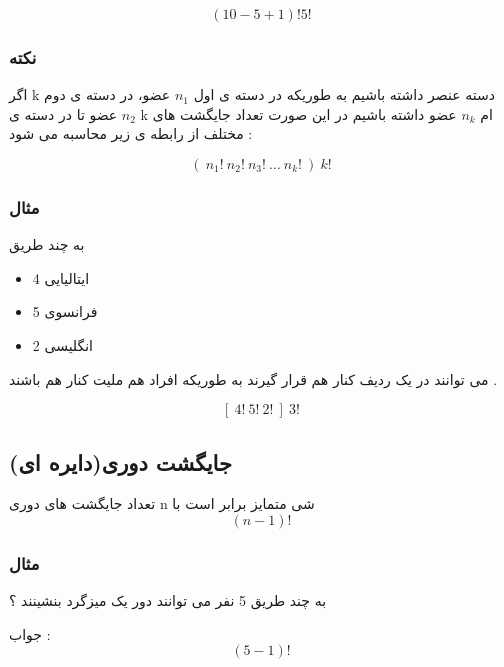 \documentclass[12pt]{book}
\begin{document}
$$
(10-5+1)! 5!
$$


\subsubsection{نکته}
اگر k دسته عنصر داشته باشیم به طوریکه در دسته ی اول $n_{1}$ عضو، در دسته ی دوم $n_{2}$ عضو تا در دسته ی k ام $n_{k}$ عضو داشته باشیم در این صورت تعداد جایگشت های مختلف از رابطه ی زیر محاسبه می شود :\newline


$$
( \: n_{1}! \: n_{2}! \: n_{3}! \: \dots \: n_{k}! \: ) \: k !
$$


\subsubsection{مثال}
به چند طریق 
\begin{itemize}
	\item 4 ایتالیایی
	\item 5 فرانسوی
	\item 2 انگلیسی
\end{itemize}

می توانند در یک ردیف کنار هم قرار گیرند به طوریکه افراد هم ملیت کنار هم باشند .

$$
[ \: 4! \: 5! \: 2! \: ] \: 3!
$$



\subsection{جایگشت دوری(دایره ای)}
تعداد جایگشت های دوری n شی متمایز برابر است با 
$$
(n-1)!
$$


\subsubsection{مثال}
به چند طریق 5 نفر می توانند دور یک میزگرد بنشینند ؟

جواب :
$$
(5-1)!
$$
\end{document}
